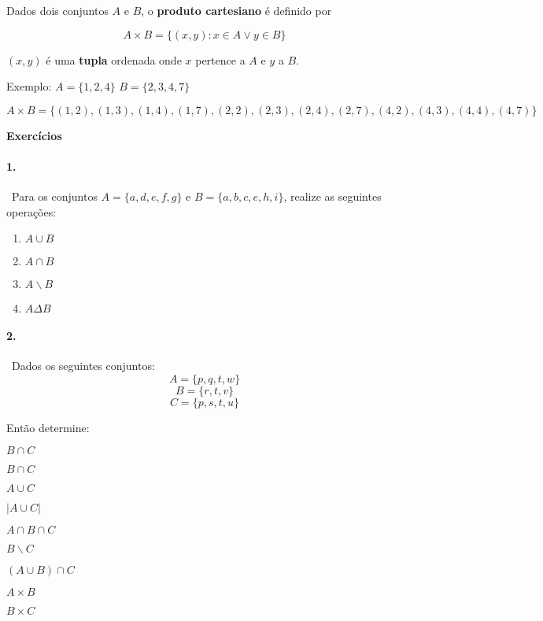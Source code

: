 Dados dois conjuntos \(A\) e \(B\), o \textbf{produto cartesiano} é
definido por

\[A\times B = \{(x,y) : x \in A \lor y \in B\}\]

\((x,y)\) é uma \textbf{tupla} ordenada onde \(x\) pertence a \(A\) e
\(y\) a \(B\).

Exemplo: \(A=\{1,2,4\}\) \(B=\{2,3,4,7\}\)

\(A\times B = \{(1,2),(1,3),(1,4),(1,7),(2,2),(2,3),(2,4),(2,7),(4,2),(4,3),(4,4),(4,7)\}\)

\bigskip\noindent
\centerline{\bf Exercícios}

\paragraph{1.}~Para os conjuntos \(A = \{a, d, e, f, g\}\) e
\(B = \{a, b, c, e, h, i\}\), realize as seguintes operações:

\begin{enumerate}
\def\labelenumi{\alph{enumi}.}
\item
  \(A \cup B\)
\item
  \(A \cap B\)
\item
  \(A \backslash B\)
\item
  \(A \Delta B\)
\end{enumerate}

\paragraph{2.}~Dados os seguintes conjuntos: \[A=\{p,q,t,w\}\] \[ B = \{r,t,v\}\]
  \[C=\{p,s,t,u\}\]

\noindent Então determine:

\begin{enumerate}
\def\labelenumi{\alph{enumi}.}
	\begin{minipage}{.5\textwidth}
		\item \(B\cap C\)
		\item \(B\cap C\)
		\item  \(A\cup C\)
		\item \(|A\cup C|\)
		\item  \(A \cap B \cap C\)
	\end{minipage}
	\begin{minipage}{.5\textwidth}
		\item  \(B \backslash C\)
		\item  \((A\cup B)\cap C\)
		\item  \(A\times B\)
		\item  \(B\times C\)
	\end{minipage}
\end{enumerate}

